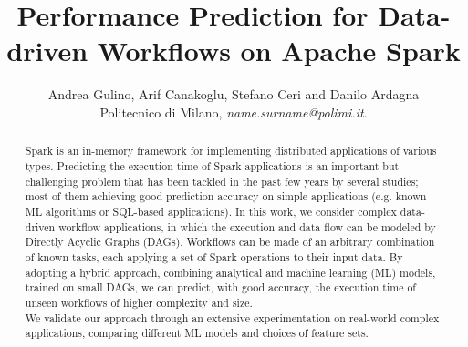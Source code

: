 \documentclass[a4paper, 10pt, conference]{ieeeconf}      %
\title{\LARGE \bf
Performance Prediction for Data-driven Workflows on Apache Spark 
}
\author{Andrea Gulino, Arif Canakoglu, Stefano Ceri and Danilo Ardagna\\Politecnico di Milano, \textit{name.surname@polimi.it}.}
\begin{document}
\maketitle
\thispagestyle{empty}
\pagestyle{empty}


\begin{abstract}

Spark is an in-memory framework for implementing distributed applications of various types.
Predicting the execution time of Spark applications is an important but challenging problem that has been tackled in the past few years by several studies; most of them achieving good prediction accuracy on simple applications (e.g. known ML algorithms or SQL-based applications).
In this work, we consider complex data-driven workflow applications, in which the execution and data flow can be modeled by Directly Acyclic Graphs (DAGs).  Workflows can be made of an arbitrary combination of known tasks, each applying a set of Spark operations to their input data.
By adopting a hybrid approach, combining analytical and machine learning (ML) models, trained on small DAGs, we can predict, with good accuracy, the execution time of unseen workflows of higher complexity and size. \\
We validate our approach through an extensive experimentation on  real-world complex applications, comparing different ML models and choices of feature sets.


\end{abstract}
\end{document}

